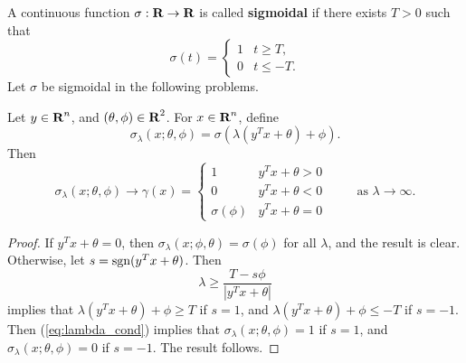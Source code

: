 \documentclass{homework}
\begin{document}
	\maketitle
	
	A continuous function $\sigma : \textbf{R} \to \textbf{R}$ is called \textbf{sigmoidal} if there exists $T > 0$ such that
	\begin{equation}
		\sigma(t) = \begin{cases}
			1 & t \ge T, \\
			0 & t \le -T.
		\end{cases}
	\end{equation}
	Let $\sigma$ be sigmoidal in the following problems.
	
	\question Let $y \in \textbf{R}^n$, and $(\theta, \phi) \in \textbf{R}^2$. For $x \in \textbf{R}^n$, define
	\begin{equation}
		\sigma_\lambda(x; \theta,\phi) = \sigma\left(\lambda\left(y^Tx + \theta\right) + \phi\right).
	\end{equation}
	Then
	\begin{equation}
		\sigma_\lambda(x;\theta,\phi) \to \gamma(x) = \begin{cases}
			1 & y^Tx + \theta > 0 \\
			0 & y^Tx + \theta < 0 \\
			\sigma(\phi) & y^Tx + \theta = 0
		\end{cases} \qquad \text{ as } \lambda \to\infty.
	\end{equation}
	\begin{proof}
		If $y^Tx +\theta =0$, then $\sigma_\lambda(x;\phi,\theta) = \sigma(\phi)$ for all $\lambda$, and the result is clear. Otherwise, let $s = \text{sgn}(y^Tx + \theta)$. Then
		\begin{equation}
			\label{eq:lambda_cond}
			\lambda \ge \frac{T - s\phi}{|y^Tx +\theta|}
		\end{equation}
		implies that $\lambda\left(y^Tx + \theta\right) + \phi \ge T$ if $s = 1$, and $\lambda\left(y^Tx + \theta\right) + \phi \le -T$ if $s = -1$. Then (\ref{eq:lambda_cond}) implies that $\sigma_\lambda(x;\theta,\phi) = 1$ if $s=1$, and $\sigma_\lambda(x;\theta,\phi) = 0$ if $s = -1$. The result follows.
	\end{proof}
	
\end{document}

